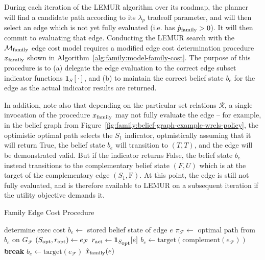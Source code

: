 During each iteration of the LEMUR algorithm over its roadmap,
the planner will find a candidate path according to its $\lambda_p$
tradeoff parameter,
and will then select an edge which is not yet fully evaluated
(i.e. has $\grave{p}_{\mbox{\scriptsize \textup{family}}} > 0$).
It will then commit to evaluating that edge.
Conducting the LEMUR search with the $\mathcal{M}_{\mbox{\scriptsize family}}$
edge cost model requires a modified edge cost determination
procedure $x_{\mbox{\scriptsize \textup{family}}}$
shown in Algorithm~\ref{alg:family:model-family-cost}.
The purpose of this procedure is to
(a) delegate the edge evaluation to the correct edge subset indicator
functions $\mathbf{1}_{S}[\cdot]$,
and (b) to maintain the correct belief state $b_e$ for the edge
as the actual indicator results are returned.

In addition,
note also that depending on the particular set relations $\mathcal{R}$,
a single invocation of the procedure $x_{\mbox{\scriptsize \textup{family}}}$
may not fully evaluate the edge --
for example, in the belief graph
from Figure~\ref{fig:family:belief-graph-example-wrels-policy},
the optimistic optimal path selects the $S_1$ indicator,
optmistically assuming that it will return True,
the belief state $b_e$ will transition to $(T,T)$,
and the edge will be demonstrated valid.
But if the indicator returns False,
the belief state $b_e$ instead transitions to the complementary
belief state $(F,U)$ which is at the target of the complementary edge
$(S_1,\mbox{F})$.
At this point,
the edge is still not fully evaluated,
and is therefore available to LEMUR on a subsequent iteration
if the utility objective demands it.

\begin{algorithm}
\caption{Family Edge Cost Procedure}
\label{alg:family:model-family-cost}
\begin{algorithmic}[1]
   \Comment determine exec cost
   \State $b_e \leftarrow$ stored belief state of edge $e$
      \State $\pi_{\mathcal{F}} \leftarrow$ optimal path from $b_e$
         on $G_{\mathcal{F}}$
         \State $(S_{\mbox{\scriptsize opt}},r_{\mbox{\scriptsize opt}}) \leftarrow e_{\mathcal{F}}$
         \State $r_{\mbox{\scriptsize act}} \leftarrow \mathbf{1}_{S_{\mbox{\scriptsize opt}}}[e]$
            \State $b_e \leftarrow \mbox{target}(\mbox{complement}(e_{\mathcal{F}}))$
            \State \textbf{break}
         \EndIf
         \State $b_e \leftarrow \mbox{target}(e_{\mathcal{F}})$
      \EndFor
   \EndIf
   \State \Return $\hat{x}_{\mbox{\scriptsize \textup{family}}}(e)$
\EndProcedure
\end{algorithmic}
\end{algorithm}

